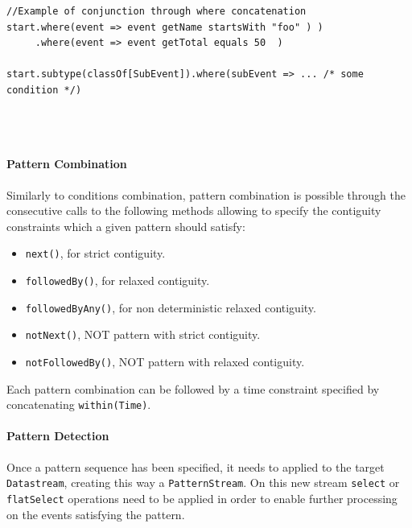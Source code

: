 \begin{code}
    \label{code:simple-cond}
    \begin{verbatim}
//Example of conjunction through where concatenation
start.where(event => event getName startsWith "foo" ) )
     .where(event => event getTotal equals 50  )

start.subtype(classOf[SubEvent]).where(subEvent => ... /* some condition */)


    \end{verbatim}
\end{code}~\\

\paragraph{Pattern Combination}

Similarly to conditions combination, pattern combination is possible through the consecutive calls to the following methods allowing to specify the contiguity constraints which a given pattern should satisfy:

\begin{itemize}
    
    \item \verb|next()|, for strict contiguity.
    \item \verb|followedBy()|, for relaxed contiguity.
    \item \verb|followedByAny()|, for non deterministic relaxed contiguity.
    \item \verb|notNext()|, NOT pattern with strict contiguity.
    \item \verb|notFollowedBy()|, NOT pattern with relaxed contiguity.

\end{itemize}

Each pattern combination can be followed by a time constraint specified by concatenating \verb|within(Time)|.

\paragraph{Pattern Detection}

Once a pattern sequence has been specified, it needs to applied to the target \verb|Datastream|, creating this way a \verb|PatternStream|.
On this new stream \verb|select| or \verb|flatSelect| operations need to be applied in order to enable further processing on the events satisfying the pattern.

